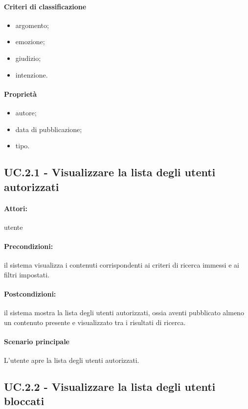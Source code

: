 \documentclass[10pt,a4paper,headinclude,footinclude,hidelinks]{scrreprt} %
\begin{document}
	\paragraph{Criteri di classificazione}
	\begin{itemize}
	\item argomento;
	\item emozione;
	\item giudizio;
	\item intenzione.
	\end{itemize}

	\paragraph{Propriet\`a}
	\begin{itemize}
	\item autore;
	\item data di pubblicazione;
	\item tipo.
	\end{itemize}

	\subsection[UC.2.1]{UC.2.1 - Visualizzare la lista degli utenti autorizzati}
	\label{sec:stage:ar:uc:2_1}
	\paragraph{Attori:} utente
	\paragraph{Precondizioni:} il sistema visualizza i contenuti corrispondenti ai criteri di ricerca immessi e ai filtri impostati.
	\paragraph{Postcondizioni:} il sistema mostra la lista degli utenti autorizzati, ossia aventi pubblicato almeno un contenuto presente e visualizzato tra i risultati di ricerca.
	\paragraph{Scenario principale}
	L'utente apre la lista degli utenti autorizzati.

	\subsection[UC.2.2]{UC.2.2 - Visualizzare la lista degli utenti bloccati}
	\label{sec:stage:ar:uc:2_2}
\end{document}
